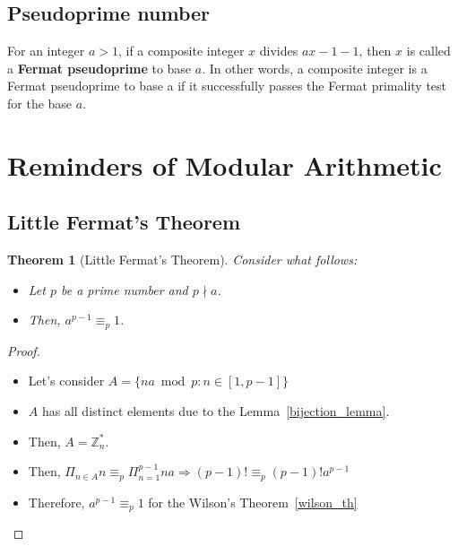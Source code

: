\documentclass[12pt, a4paper, english]{report}
\newtheorem{theorem}{Theorem}
\begin{document}
\subsection{Pseudoprime number}
For an integer $a > 1$, if a composite integer $x$ divides $ax-1 - 1$, then $x$ is called a \textbf{Fermat pseudoprime} to base $a$.\newline
 In other words, a composite integer is a Fermat pseudoprime to base a if it successfully passes the Fermat primality test for the base $a$.

\section{Reminders of Modular Arithmetic}
\subsection{Little Fermat's Theorem}\label{little_fermat_th}
\begin{theorem}[Little Fermat's Theorem]
    Consider what follows:
    \begin{itemize}
        \item Let $p$ be a prime number and $p \nmid a$.
        \item Then, $a^{p-1} \equiv_{p} 1$.
    \end{itemize}
\end{theorem}
\begin{proof}
    \begin{itemize}
        \item Let's consider $A = \{na \bmod p: n \in [1, p-1]\}$
        \item $A$ has all distinct elements due to the Lemma~\ref{bijection_lemma}.
        \item Then, $A = \mathbb{Z}_{n}^{*}$.
        \item Then, $\Pi_{n \in A} n \equiv_{p} \Pi_{n=1}^{p-1} na \Rightarrow (p-1)! \equiv_{p} (p-1)!a^{p-1}$
        \item Therefore, $a^{p-1} \equiv_{p} 1$ for the Wilson's Theorem~\ref{wilson_th}
    \end{itemize}
\end{proof}
\end{document}
